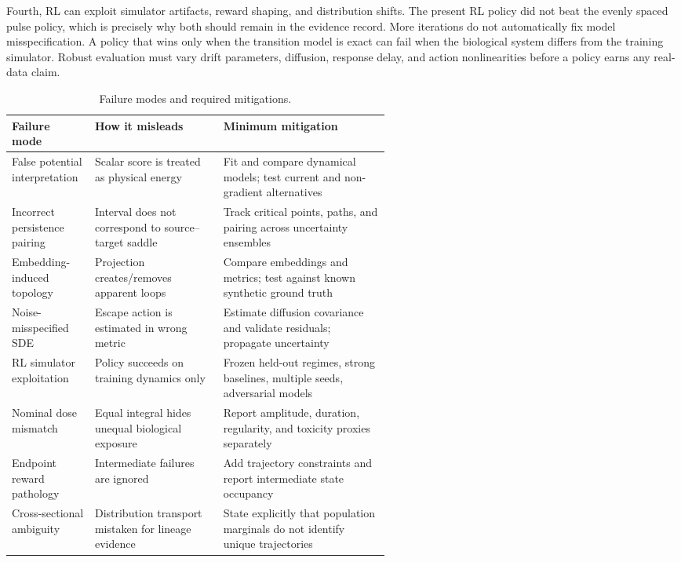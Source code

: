\documentclass[11pt]{article}
\newcommand{\1}{\mathbf{1}}
\begin{document}
Fourth, RL can exploit simulator artifacts, reward shaping, and distribution shifts. The present RL policy did not beat the evenly spaced pulse policy, which is precisely why both should remain in the evidence record. More iterations do not automatically fix model misspecification. A policy that wins only when the transition model is exact can fail when the biological system differs from the training simulator. Robust evaluation must vary drift parameters, diffusion, response delay, and action nonlinearities before a policy earns any real-data claim.

\begin{table}[tbp]\centering\small
\caption{Failure modes and required mitigations.}
\label{tab:failures}
\begin{tabularx}{\linewidth}{@{}p{0.22\linewidth}p{0.34\linewidth}X@{}}\toprule
Failure mode & How it misleads & Minimum mitigation \\\midrule
False potential interpretation & Scalar score is treated as physical energy & Fit and compare dynamical models; test current and non-gradient alternatives \\
Incorrect persistence pairing & Interval does not correspond to source--target saddle & Track critical points, paths, and pairing across uncertainty ensembles \\
Embedding-induced topology & Projection creates/removes apparent loops & Compare embeddings and metrics; test against known synthetic ground truth \\
Noise-misspecified SDE & Escape action is estimated in wrong metric & Estimate diffusion covariance and validate residuals; propagate uncertainty \\
RL simulator exploitation & Policy succeeds on training dynamics only & Frozen held-out regimes, strong baselines, multiple seeds, adversarial models \\
Nominal dose mismatch & Equal integral hides unequal biological exposure & Report amplitude, duration, regularity, and toxicity proxies separately \\
Endpoint reward pathology & Intermediate failures are ignored & Add trajectory constraints and report intermediate state occupancy \\
Cross-sectional ambiguity & Distribution transport mistaken for lineage evidence & State explicitly that population marginals do not identify unique trajectories \\
\bottomrule\end{tabularx}
\end{table}
\end{document}
